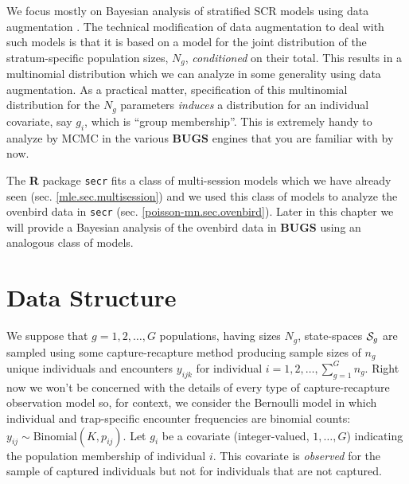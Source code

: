 We focus mostly on Bayesian analysis of stratified SCR models using
data augmentation \citep{royle_etal:2012arXiv,royle_converse:2013}. 
The technical modification of data augmentation to deal with such
models is that it is based on a model for the joint distribution of
the stratum-specific population sizes, 
$N_{g}$, {\it conditioned} on their total. This results in a 
multinomial distribution which we can analyze in some generality using data
augmentation.  As a practical matter, specification of this multinomial
distribution for the $N_{g}$ parameters {\it induces} a distribution
for an individual covariate, say $g_{i}$, which is ``group membership''. 
This is extremely handy to analyze by MCMC in the various {\bf BUGS}
engines that you are familiar with by now.

The {\bf R} package \mbox{\tt secr} fits a class of multi-session
models which we have already seen (sec. \ref{mle.sec.multisession})
and we used this class of models to analyze the ovenbird data in
\mbox{\tt secr} (sec. \ref{poisson-mn.sec.ovenbird}). Later in this
chapter we will provide a Bayesian analysis of the ovenbird data in
{\bf BUGS} using an analogous class of models.










\section{Data Structure}


We suppose that $g=1,2,\ldots,G$ populations, having sizes $N_{g}$,
state-spaces ${\cal S}_{g}$ are sampled using some capture-recapture
method producing sample sizes of $n_{g}$ unique individuals and
encounters $y_{ijk}$ for individual $i=1,2,\ldots, \sum_{g=1}^{G}
n_{g}$.  Right now we won't be concerned with the details of every
type of capture-recapture observation model so, for context, we
consider the Bernoulli model in which individual and trap-specific
encounter frequencies are binomial counts: $y_{ij} \sim
\mbox{Binomial}(K,p_{ij})$.  Let $g_{i}$ be a covariate
(integer-valued, $1, \ldots, G$) indicating the population membership
of individual $i$. This covariate is {\it observed} for the sample of
captured individuals but not for individuals that are not captured.


